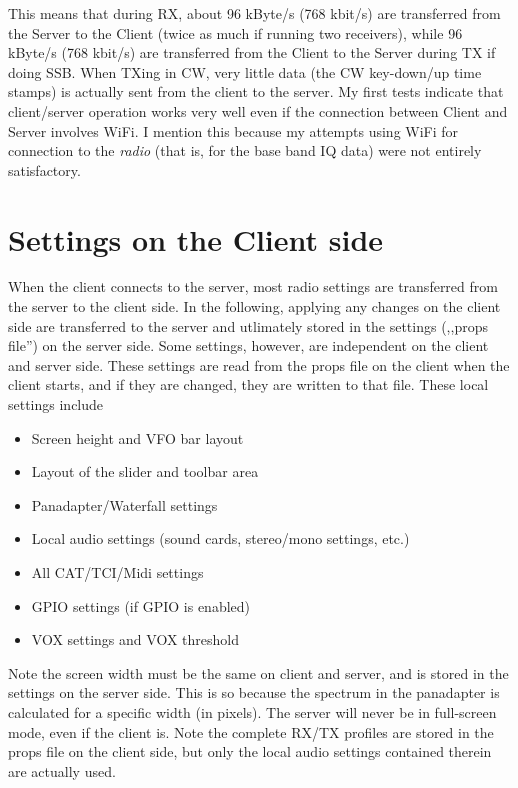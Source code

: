 \documentclass[12pt]{book}
\begin{document}
This means that during RX, about 96 kByte/s (768 kbit/s) are transferred from the Server to the Client
(twice as much if running two receivers), while 96 kByte/s (768 kbit/s)  are transferred
from the Client to the Server during
TX if doing SSB. When TXing in CW, very little data (the CW key-down/up time stamps) is actually sent from the client
to the server.
My first tests indicate that client/server operation works very well even
if  the connection between Client and Server
involves WiFi. I mention this because my attempts using WiFi for connection to the \textit{radio}
(that is, for the base band IQ data) were not entirely satisfactory.

\section{Settings on the Client side}
When the client connects to the server, most radio settings are transferred from the server to the client
side. In the following, applying any changes on the client side are transferred to the server and
utlimately stored in the settings (,,props file'') on the server side. Some settings, however, are independent
on the client and server side. These settings are read from the props file on the client when the client
starts, and if they are changed, they are written to that file. These local settings include
\begin{itemize}
\item{Screen height and VFO bar layout}
\item{Layout of the slider and toolbar area}
\item{Panadapter/Waterfall settings}
\item{Local audio settings (sound cards, stereo/mono settings, etc.)}
\item{All CAT/TCI/Midi settings}
\item{GPIO settings (if GPIO is enabled)}
\item{VOX settings and VOX threshold}
\end{itemize}
Note the screen width must be the same on client and server, and is stored in the settings on the server
side. This is so because the spectrum in the panadapter is calculated for a specific width (in pixels).
The server will never be in full-screen mode, even if the client is. Note the complete RX/TX profiles
are stored in the props file on the client side, but only the local audio settings contained therein
are actually used.
\end{document}
